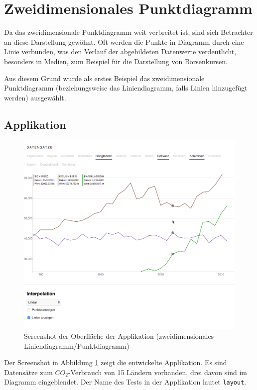 \section{Zweidimensionales Punktdiagramm}

Da das zweidimensionale Punktdiagramm weit verbreitet ist, sind sich Betrachter an diese Darstellung gewöhnt. Oft werden die Punkte in Diagramm durch eine Linie verbunden, was den Verlauf der abgebildeten Datenwerte verdeutlicht, besonders in Medien, zum Beispiel für die Darstellung von Börsenkursen. 

Aus diesem Grund wurde als erstes Beispiel das zweidimensionale Punktdiagramm (beziehungsweise das Liniendiagramm, falls Linien hinzugefügt werden) ausgewählt.


\subsection{Applikation}

\begin{figure}[!htbp]
	\centering
	\includegraphics[width=\linewidth]{images/2dline}
	\caption{Screenshot der Oberfläche der Applikation (zweidimensionales Liniendiagramm/Punktdiagramm)}
	\label{fig:screenshot}
\end{figure}

Der Screenshot in Abbildung \ref{fig:screenshot} zeigt die entwickelte Applikation. Es sind Datensätze \cite{worldbank} zum $CO_2$-Verbrauch von 15 Ländern vorhanden, drei davon sind im Diagramm eingeblendet. Der Name des Tests in der Applikation lautet \texttt{layout}.

